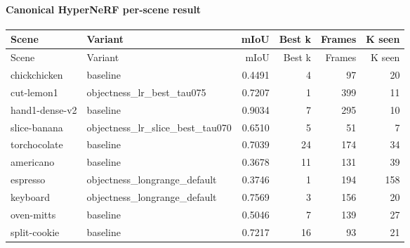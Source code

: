 \documentclass[10pt]{article}
\begin{document}
\paragraph{Canonical HyperNeRF per-scene result}
\small
\begin{longtable}{llrrrr}
\toprule
Scene & Variant & mIoU & Best k & Frames & K seen \\
\midrule
\endfirsthead
\toprule
Scene & Variant & mIoU & Best k & Frames & K seen \\
\midrule
\endhead
chickchicken & baseline & 0.4491 & 4 & 97 & 20 \\
cut-lemon1 & objectness\_lr\_best\_tau075 & 0.7207 & 1 & 399 & 11 \\
hand1-dense-v2 & baseline & 0.9034 & 7 & 295 & 10 \\
slice-banana & objectness\_lr\_slice\_best\_tau070 & 0.6510 & 5 & 51 & 7 \\
torchocolate & baseline & 0.7039 & 24 & 174 & 34 \\
americano & baseline & 0.3678 & 11 & 131 & 39 \\
espresso & objectness\_longrange\_default & 0.3746 & 1 & 194 & 158 \\
keyboard & objectness\_longrange\_default & 0.7569 & 3 & 156 & 20 \\
oven-mitts & baseline & 0.5046 & 7 & 139 & 27 \\
split-cookie & baseline & 0.7217 & 16 & 93 & 21 \\
\bottomrule
\end{longtable}
\normalsize
\end{document}

